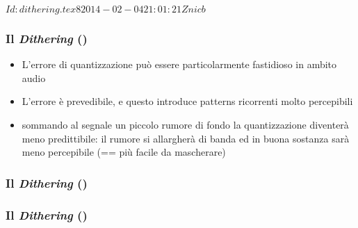 %
%
\svnInfo $Id: dithering.tex 8 2014-02-04 21:01:21Z nicb $

\setcounter{ms}{0}
\begin{frame}
    \frametitle{Il \emph{Dithering} ()}

        \begin{itemize}[<+- | alert@+->]

            \item L'errore di quantizzazione pu\`o essere particolarmente
                fastidioso in ambito audio

            \item L'errore \`e prevedibile, e questo introduce
                patterns ricorrenti molto percepibili

            \item sommando al segnale un piccolo rumore di fondo la
                quantizzazione diventer\`a meno predittibile: il rumore
                si allargher\`a di banda ed in buona sostanza sar\`a meno
                percepibile (== pi\`u facile da mascherare)

        \end{itemize}

\end{frame}

\begin{frame}
    \frametitle{Il \emph{Dithering} ()}

    \begin{center}
    \end{center}

\end{frame}

\begin{frame}
    \frametitle{Il \emph{Dithering} ()}

    \begin{center}
    \end{center}

\end{frame}
